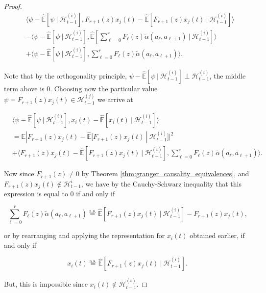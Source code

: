 \documentclass{statsoc}
\def\H{\mathcal{H}}  %
\newcommand{\linE}[2]{\hat{\E}[#1\ |\ #2]}  %
\newcommand{\wtalpha}[2]{\widetilde{\alpha}(#1, #2)}  %
\def\H{\mathcal{H}}  %
\def\E{\mathbb{E}}  %
\newcommand{\inner}[2]{\langle #1, #2 \rangle}  %
\begin{document}
\begin{proof}
  \begin{align*}
    &\inner{\psi - \linE{\psi}{\H_{t - 1}^{(i)}}}{F_{r + 1}(z)x_j(t) - \linE{F_{r + 1}(z)x_j(t)}{\H_{t - 1}^{(i)}}}\\
    &- \inner{\psi - \linE{\psi}{\H_{t - 1}^{(i)}}}{\linE{\sum_{\ell = 0}^r F_\ell(z)\wtalpha{a_\ell}{a_{\ell + 1}}}{\H_{t - 1}^{(i)}}}\\
    &+ \inner{\psi - \linE{\psi}{\H_{t - 1}^{(i)}}}{\sum_{\ell = 0}^r F_\ell(z)\wtalpha{a_\ell}{a_{\ell + 1}}}.
  \end{align*}

  Note that by the orthogonality principle, $\psi - \linE{\psi}{\H_{t - 1}^{(i)}} \perp \H_{t - 1}^{(i)}$, the middle term above is $0$.  Choosing now the particular value $\psi = F_{r + 1}(z)x_j(t) \in \H_{t - 1}^{(j)}$ we arrive at

  \begin{align*}
    &\inner{\psi - \linE{\psi}{\H_{t - 1}^{(i)}}}{x_i(t) - \linE{x_i(t)}{\H_{t - 1}^{(i)}}}\\
    &= \E|F_{r + 1}(z)x_j(t) - \linE{F_{r + 1}(z)x_j(t)}{\H_{t - 1}^{(i)}}|^2\\
    &+ \inner{F_{r + 1}(z)x_j(t) - \linE{F_{r + 1}(z)x_j(t)}{\H_{t - 1}^{(i)}}}{\sum_{\ell = 0}^r F_\ell(z) \wtalpha{a_\ell}{a_{\ell + 1}}}.
  \end{align*}

  Now since $F_{r + 1}(z) \ne 0$ by Theorem
  \ref{thm:granger_causality_equivalences}, and
  $F_{r + 1}(z)x_j(t) \not\in \H_{t - 1}^i$, we have by the
  Cauchy-Schwarz inequality that this expression is equal to $0$ if
  and only if

  \begin{equation*}
    \sum_{\ell = 0}^r F_\ell(z) \wtalpha{a_\ell}{a_{\ell + 1}} \overset{\text{a.s.}}{=} \linE{F_{r + 1}(z)x_j(t)}{\H_{t - 1}^{(i)}} - F_{r + 1}(z)x_j(t),
  \end{equation*}

  or by rearranging and applying the representation for $x_i(t)$
  obtained earlier, if and only if

  \begin{equation*}
    x_i(t) \overset{\text{a.s.}}{=} \linE{F_{r + 1}(z)x_j(t)}{\H_{t - 1}^{(i)}}.
  \end{equation*}

  But, this is impossible since $x_i(t) \not \in \H_{t - 1}^{(i)}$.
\end{proof}
\end{document}
